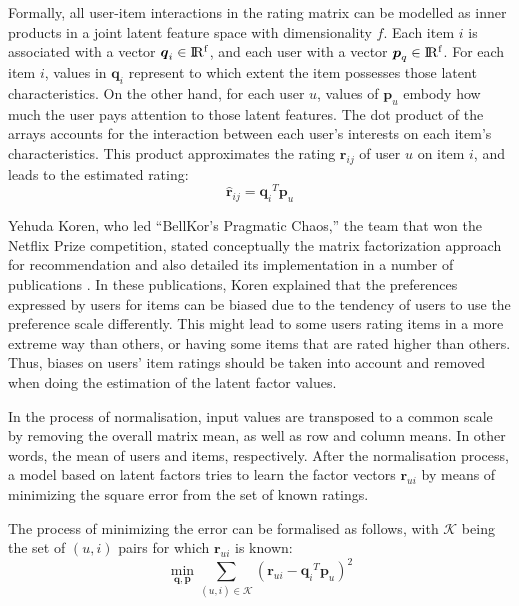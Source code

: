 Formally, all user-item interactions in the rating matrix can be modelled as inner products in a joint latent feature space with dimensionality $f$.
Each item $i$ is associated with a vector $\boldsymbol{q}_i \in {\rm I\!R^f}$, and each user with a vector $\boldsymbol{p}_q \in {\rm I\!R^f}$.
For each item $i$, values in $\boldsymbol{q}_i$ represent to which extent the item possesses those latent characteristics. On the other hand, for each user $u$, values of $\boldsymbol{p}_u$ embody how much the user pays attention to those latent features. 
The dot product of the arrays  accounts for the interaction between each user's interests on each item's characteristics. This product approximates the rating $\boldsymbol{r}_{ij}$ of user $u$ on item $i$, and leads to the estimated rating:
\begin{equation}
\hat{\boldsymbol{r}}_{ij} = {\boldsymbol{q}_i}^T \boldsymbol{p}_u
\end{equation}

Yehuda Koren, who led ``BellKor's Pragmatic Chaos,'' the team that won the Netflix  Prize competition, stated conceptually the matrix factorization approach for recommendation and also detailed its implementation in a number of publications \autocite{koren08factorization, koren09collaborative, koren09matrix, koren15advances}. 
In these publications, Koren explained that the preferences expressed by users for items can be biased due to the tendency of users to use the preference scale differently. This might lead to some users rating items in a more extreme way than others, or having some items that are rated higher than others. Thus, biases on users' item ratings should be taken into account and removed when doing the estimation of the latent factor values. 

In the process of normalisation, input values are transposed to a common scale by removing the overall matrix mean, as well as row and column means. In other words, the mean of users and items, respectively. After the normalisation process, a model based on latent factors tries to learn the factor vectors $\boldsymbol{r}_{ui}$ by means of minimizing the square error from the set of known ratings. 

The process of minimizing the error can be formalised as follows, with $\mathcal{K}$ being the set of $(u,i)$ pairs for which $\boldsymbol{r}_{ui}$ is known:
\begin{equation}
\min_{\boldsymbol{q}, \boldsymbol{p}} 
\displaystyle\sum_{(u,i) \in \mathcal{K}} 
(\boldsymbol{r}_{ui} - {\boldsymbol{q}_i}^T \boldsymbol{p}_u)^2 
\end{equation}

